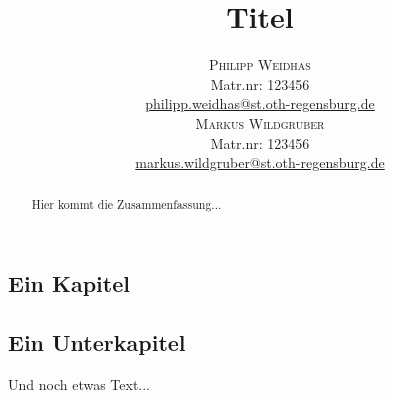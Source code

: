 \documentclass[twosided,a4,10pt]{article}
\title{\vspace{-5mm}%
	\fontsize{20pt}{10pt}\selectfont
	\textbf{Titel}
	}
\author{
	\large
       \begin{minipage}[t]{0.5\linewidth}
         \begin{center}
           	\textsc{Philipp Weidhas}\\[2mm]
                 \normalsize	Matr.nr: 123456\\
                 \normalsize
                 \href{mailto:philipp.weidhas@st.oth-regensburg.de}
                 {philipp.weidhas@st.oth-regensburg.de}      
         \end{center}
       \end{minipage}        
       \begin{minipage}[t]{0.5\linewidth}
         \begin{center}
           	\textsc{Markus Wildgruber}\\[2mm]
                 \normalsize	Matr.nr: 123456\\
                 \normalsize
                 \href{mailto:markus.wildgruber@st.oth-regensburg.de}
                 {markus.wildgruber@st.oth-regensburg.de}      
         \end{center}
       \end{minipage}
     }
\begin{document}
\maketitle
\thispagestyle{fancy}

\begin{abstract}
\noindent Hier kommt die Zusammenfassung...
\end{abstract}
	

\begin{multicols}{2}


 \section{Ein Kapitel}

 \subsection{Ein Unterkapitel}
 Und noch etwas Text... \cite{muster}


\end{multicols}
\end{document}
